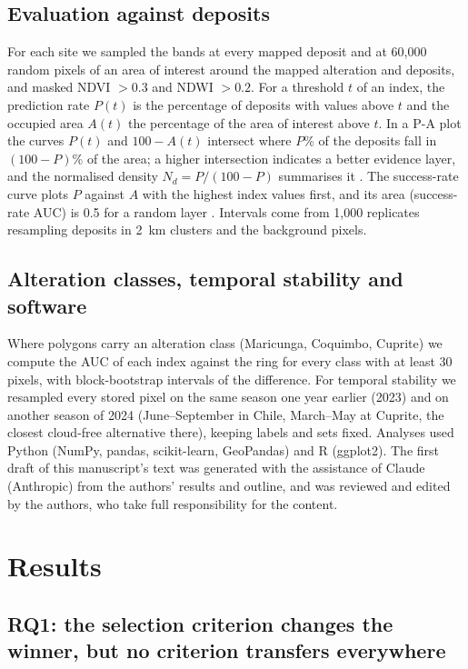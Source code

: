 \documentclass[preprint,authoryear,number]{elsarticle}
\begin{document}
\subsection{Evaluation against deposits}
\label{sec:pa}

For each site we sampled the bands at every mapped deposit and at 60{,}000 random pixels of an area of interest around the mapped alteration and deposits, and masked NDVI $>0.3$ and NDWI $>0.2$. For a threshold $t$ of an index, the prediction rate $P(t)$ is the percentage of deposits with values above $t$ and the occupied area $A(t)$ the percentage of the area of interest above $t$. In a P-A plot the curves $P(t)$ and $100 - A(t)$ intersect where $P$\% of the deposits fall in $(100-P)$\% of the area; a higher intersection indicates a better evidence layer, and the normalised density $N_d = P/(100-P)$ summarises it \citep{Yousefi2015}. The success-rate curve plots $P$ against $A$ with the highest index values first, and its area (success-rate AUC) is 0.5 for a random layer \citep{Chung2003}. Intervals come from 1{,}000 replicates resampling deposits in \SI{2}{\kilo\meter} clusters and the background pixels.

\subsection{Alteration classes, temporal stability and software}

Where polygons carry an alteration class (Maricunga, Coquimbo, Cuprite) we compute the AUC of each index against the ring for every class with at least 30 pixels, with block-bootstrap intervals of the difference. For temporal stability we resampled every stored pixel on the same season one year earlier (2023) and on another season of 2024 (June--September in Chile, March--May at Cuprite, the closest cloud-free alternative there), keeping labels and sets fixed. Analyses used Python (NumPy, pandas, scikit-learn, GeoPandas) and R (ggplot2). The first draft of this manuscript's text was generated with the assistance of Claude (Anthropic) from the authors' results and outline, and was reviewed and edited by the authors, who take full responsibility for the content.

\section{Results}
\label{sec:results}

\subsection{RQ1: the selection criterion changes the winner, but no criterion transfers everywhere}
\label{sec:rq1}
\end{document}
